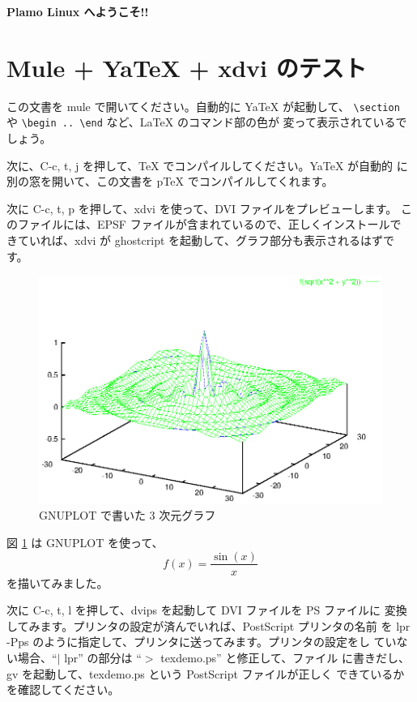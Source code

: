 \documentclass{jarticle}
\begin{document}
\begin{center}
{\LARGE \bf Plamo Linux へようこそ!!}
\end{center}

\vspace{1cm}

\section{Mule + YaTeX + xdvi のテスト}

この文書を mule で開いてください。自動的に YaTeX が起動して、
\verb+\section+ や \verb+\begin .. \end+ など、LaTeX のコマンド部の色が
変って表示されているでしょう。

次に、C-c, t, j を押して、TeX でコンパイルしてください。YaTeX が自動的
に別の窓を開いて、この文書を pTeX でコンパイルしてくれます。

次に C-c, t, p を押して、xdvi を使って、DVI ファイルをプレビューします。
このファイルには、EPSF ファイルが含まれているので、正しくインストールで
きていれば、xdvi が ghostcript を起動して、グラフ部分も表示されるはずで
す。

\begin{figure}[hb]
\begin{center}

\includegraphics{gnuplot-demo.eps}
\caption{GNUPLOT で書いた 3 次元グラフ}
\label{figdemo}

\end{center}
\end{figure}


図 \ref{figdemo} は GNUPLOT を使って、
\[
f(x) = \frac{\sin (x)}{x}
\]
を描いてみました。

次に C-c, t, l を押して、dvips を起動して DVI ファイルを PS ファイルに
変換してみます。プリンタの設定が済んでいれば、PostScript プリンタの名前
を lpr -Pps のように指定して、プリンタに送ってみます。プリンタの設定をし
ていない場合、``$|$ lpr'' の部分は ``$>$ texdemo.ps'' と修正して、ファイル
に書きだし、gv を起動して、texdemo.ps という PostScript ファイルが正しく
できているかを確認してください。
\end{document}
